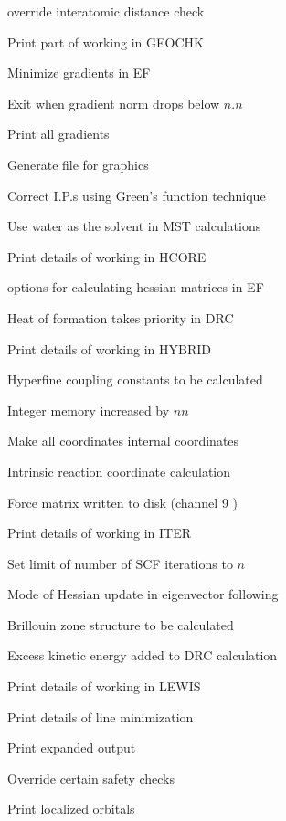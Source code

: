 \begin{description}
\item[] override interatomic distance check
\item[] Print part of working in GEOCHK
\item[] Minimize gradients in EF
\item[] Exit when gradient norm drops below $n.n$
\item[] Print all gradients
\item[] Generate file for graphics
\item[] Correct I.P.s using Green's function technique
\item[] Use water as the solvent in MST calculations
\item[] Print details of working in HCORE
\item[] options for calculating hessian matrices in EF
\item[] Heat of formation takes priority in DRC
\item[] Print details of working in HYBRID
\item[] Hyperfine coupling constants to be calculated
\item[] Integer memory increased by $nn$
\item[] Make all coordinates internal coordinates
\item[] Intrinsic reaction coordinate calculation
\item[] Force matrix written to disk (channel 9 )
\item[] Print details of working in ITER
\item[] Set limit of number of SCF iterations to $n$
\item[] Mode of Hessian update in eigenvector following
\item[] Brillouin zone structure to be calculated
\item[] Excess kinetic energy added to DRC calculation
\item[] Print details of working in LEWIS
\item[] Print details of line minimization
\item[] Print expanded output
\item[] Override certain safety checks
\item[] Print localized orbitals

\end{description}
